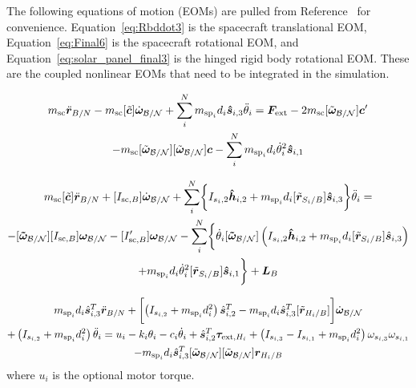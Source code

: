 The following equations of motion (EOMs) are pulled from Reference~ for convenience. Equation~\eqref{eq:Rbddot3} is the spacecraft translational EOM, Equation~\eqref{eq:Final6} is the spacecraft rotational EOM, and Equation~\eqref{eq:solar_panel_final3} is the hinged rigid body rotational EOM. These are the coupled nonlinear EOMs that need to be integrated in the simulation. 

\begin{multline}
m_{\text{sc}} \ddot{\bm r}_{B/N}-m_{\text{sc}} [\tilde{\bm{c}}]\dot{\bm\omega}_{\cal B/N}+\sum_{i}^{N}m_{\text{sp}_i} d_i  \bm{\hat{s}}_{i,3}\ddot{\theta}_i = \bm F_{\textnormal{ext}} - 2 m_{\text{sc}} [\tilde{\bm\omega}_{\cal B/N}]\bm{c}'\\
-m_{\text{sc}} [\tilde{\bm\omega}_{\cal B/N}][\tilde{\bm\omega}_{\cal B/N}]\bm{c}-\sum_{i}^{N}m_{\text{sp}_i}d_i\dot{\theta}_i^2 \bm{\hat{s}}_{i,1}
\label{eq:Rbddot3}
\end{multline}

\begin{multline}
	m_{\text{sc}}[\tilde{\bm{c}}]\ddot{\bm r}_{B/N}+[I_{\text{sc},B}] \dot{\bm\omega}_{\cal B/N} +\sum\limits_{i}^{N}\biggl\lbrace I_{s_i,2}\bm{\hat{h}}_{i,2}+m_{\text{sp}_i}d_i [\tilde{\bm{r}}_{S_i/B}] \bm{\hat{s}}_{i,3}\biggr\rbrace\ddot{\theta}_i = \\
	-[\bm{\tilde{\omega}}_{\cal B/N}] [I_{\text{sc},B}] \bm\omega_{\cal B/N} 
	- [I'_{\text{sc},B}] \bm\omega_{\cal B/N} - \sum\limits_{i}^{N}\biggl\lbrace\dot{\theta}_i [\bm{\tilde{\omega}}_{\cal B/N}] \left(I_{s_i,2} \bm{\hat{h}}_{i,2}+m_{\text{sp}_i} d_i [\tilde{\bm{r}}_{S_i/B}] \hat{\bm s}_{i,3}\right)\\ +m_{\text{sp}_i}d_i\dot{\theta}_i^2[\tilde{\bm{r}}_{S_i/B}] \bm{\hat{s}}_{i,1} \biggr\rbrace + \bm{L}_B
	\label{eq:Final6}
\end{multline}

\begin{multline}
m_{\text{sp}_i} d_i \hat{\bm s}_{i,3}^{T} \ddot{\bm r}_{B/N}+ \biggl[\left(I_{s_{i,2}} + m_{\text{sp}_i}d_i^{2}\right) \hat{\bm s}_{i,2}^{T}-m_{\text{sp}_i} d_i \hat{\bm s}_{i,3}^{T} [\tilde{\bm r}_{H_i/B}]\biggr] \dot{\bm\omega}_{\cal B/N} \\
+ \left( I_{s_{i,2}} + m_{\text{sp}_i} d_i^{2} \right) \ddot \theta_i 
= u_i - k_i \theta_i - c_i \dot\theta_i + \hat{\bm s}_{i,2}^T \bm \tau_{\text{ext},H_i} + \left( I_{s_{i,3}} - I_{s_{i,1}} + m_{\text{sp}_i}d_i^{2}\right) \omega_{s_{i,3}} \omega_{s_{i,1}}\\
- m_{\text{sp}_i} d_i \hat{\bm s}_{i,3}^{T} [\tilde{\bm\omega}_{\cal B/N}][\tilde{\bm\omega}_{\cal B/N}] \bm r_{H_i/B} 
\label{eq:solar_panel_final3}
\end{multline}
where $u_i$ is the optional motor torque.

